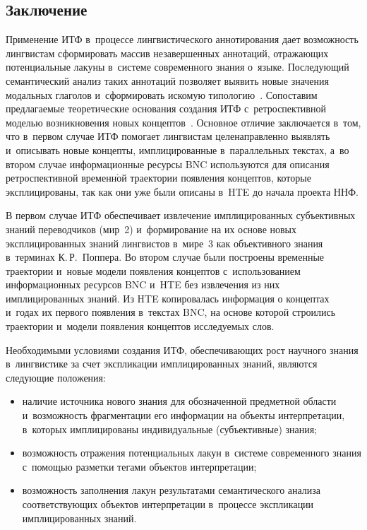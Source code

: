 \begin{multicols}{2}
\section{Заключение}
    
  Применение ИТФ в~процессе лингвистического аннотирования дает 
возможность лингвистам\linebreak
 сформировать массив незавершенных аннотаций,\linebreak 
отражающих потенциальные лакуны в~сис\-те\-ме совре\-менного знания о~языке. 
Последующий семантический анализ таких аннотаций позволяет выявить 
новые значения модальных глаголов и~сформировать искомую 
типологию~\cite{13-zat}. Сопоставим предлагаемые тео\-ре\-ти\-че\-ские основания 
создания ИТФ с~ретроспективной моделью возникновения новых 
концептов~\cite{9-zat, 10-zat, 11-zat}. Основное отличие заключается в~том, что 
в~первом случае ИТФ помогает лингвистам целенаправленно выявлять 
и~описывать новые концепты, имплицированные в~параллельных текс\-тах, а~во 
втором случае информационные ресурсы BNC используются для описания 
ретроспективной временн$\acute{\mbox{о}}$й траектории появления концептов, которые 
эксплицированы, так как они уже были описаны в~HTE до начала проекта ННФ. 
  
  В первом случае ИТФ обеспечивает извлечение имплицированных 
субъективных знаний переводчиков (мир~2) и~формирование на их основе 
новых эксплицированных знаний лингвистов в~мире~3 как объективного 
знания в~терминах К.\,Р.~Поппера. Во втором случае были построены 
временн$\acute{\mbox{ы}}$е траектории и~новые модели появления концептов с~использованием 
информационных ресурсов BNC и~HTE без извлечения из них 
имплицированных знаний. Из HTE копировалась информация о концептах 
и~годах их первого появления в~текстах BNC, на основе которой строились 
траектории и~модели появления концептов исследуемых слов.
  
  Необходимыми условиями создания ИТФ, обеспечивающих рост научного 
знания в~лингвистике за счет экспликации имплицированных знаний, являются 
следующие положения: 
  \begin{itemize}
  \item  наличие источника нового знания для обозначенной предметной 
области и~возможность фрагментации его информации на объекты 
интерпретации, в~которых имплицированы индивидуальные (субъективные) 
знания;
  \item  возможность отражения потенциальных лакун в~сис\-те\-ме современного 
знания с~помощью разметки тегами объектов интерпретации;
  \item возможность заполнения лакун результатами семантического анализа 
соответствующих объектов интерпретации в~процессе экспликации 
имплицированных знаний.
  \end{itemize}
  

\end{multicols}
